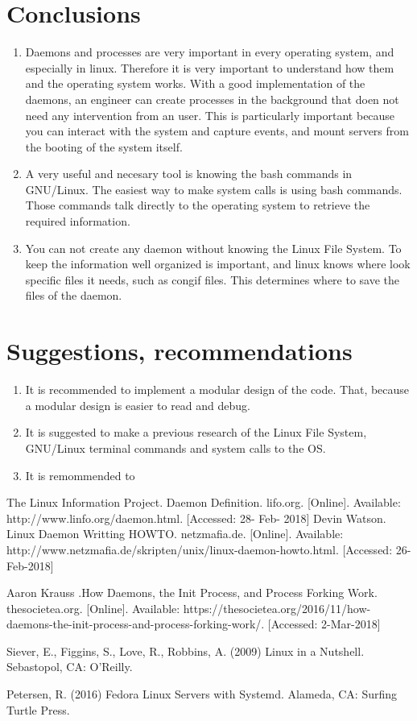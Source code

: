\documentclass[10pt]{article}
\begin{document}
\section{Conclusions}
\begin{enumerate}
    \item Daemons and processes are very important in every operating system, and especially in linux. Therefore it is very important to understand how them and the operating system works. With a good implementation of the daemons, an engineer can create processes in the background that doen not need any intervention from an user. This is particularly important because you can interact with the system and capture events, and mount servers from the booting of the system itself.
    \item A very useful and necesary tool is knowing the bash commands in GNU/Linux. The easiest way to make system calls is using bash commands. Those commands talk directly to the operating system to retrieve the required information.
    \item You can not create any daemon without knowing the Linux File System. To keep the information well organized is important, and linux knows where look specific files it needs, such as congif files. This determines where to save the files of the daemon. 
\end{enumerate}



\section{Suggestions, recommendations}
\begin{enumerate}
\item It is recommended to implement a modular design of the code. That, because a modular design is easier to read and debug. 
\item It is suggested to make a previous research of the Linux File System, GNU/Linux terminal commands and system calls to the OS.
\item It is remommended to 
\end{enumerate}


\begin{thebibliography}{9}
        The Linux Information Project. Daemon Definition. lifo.org. [Online]. Available: http://www.linfo.org/daemon.html. [Accessed: 28- Feb- 2018]
        Devin Watson. Linux Daemon Writting HOWTO. netzmafia.de. [Online]. Available: http://www.netzmafia.de/skripten/unix/linux-daemon-howto.html. [Accessed: 26-Feb-2018]
        
        Aaron Krauss .How Daemons, the Init Process, and Process Forking Work. thesocietea.org. [Online]. Available: https://thesocietea.org/2016/11/how-daemons-the-init-process-and-process-forking-work/. [Accessed: 2-Mar-2018]

        Siever, E., Figgins, S., Love, R., Robbins, A. (2009) Linux in a Nutshell. Sebastopol, CA: O'Reilly.
        
        Petersen, R. (2016) Fedora Linux Servers with Systemd. Alameda, CA: Surfing Turtle Press.


\end{thebibliography}
\end{document}
